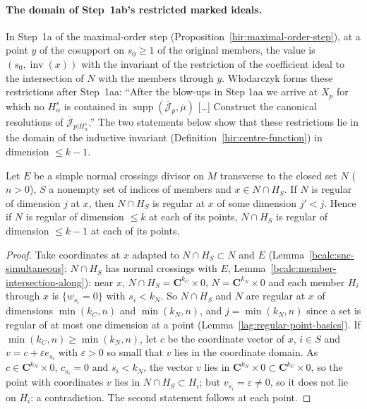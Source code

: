 \paragraph{The domain of Step~1ab's restricted marked ideals.} In Step~1a of the maximal-order step (Proposition~\ref{hir:maximal-order-step}), at a point
\(y\) of the cosupport on \(s_0\ge1\) of the original members, the value is \((s_0,\operatorname{inv}(x))\) with the invariant of the restriction of the coefficient ideal
to the intersection of \(N\) with the members through \(y\). Włodarczyk forms these restrictions after Step~1aa: ``After the blow-ups in Step 1aa we arrive at
\(X_p\) for which no \(H^s_\alpha\) is contained in \(\operatorname{supp}(\overline{\mathcal J}_p,\overline\mu)\) [\dots] Construct the canonical resolutions of
\(\overline{\mathcal J}_{p|H^s_\alpha}\).'' The two statements below show that these restrictions lie in the domain of the inductive invariant
(Definition~\ref{hir:centre-function}) in dimension \(\le k-1\).

\begin{lemma}
\label{bcalc:member-intersection-dim}
\leanok
Let \(E\) be a simple normal crossings divisor on \(M\) transverse to the closed set \(N\) (\(n>0\)), \(S\) a nonempty set of indices of members and
\(x\in N\cap H_S\). If \(N\) is regular of dimension \(j\) at \(x\), then \(N\cap H_S\) is regular at \(x\) of some dimension \(j'<j\). Hence if \(N\) is regular of
dimension \(\le k\) at each of its points, \(N\cap H_S\) is regular of dimension \(\le k-1\) at each of its points.
\end{lemma}
\begin{proof}
\leanok
Take coordinates at \(x\) adapted to \(N\cap H_S\subset N\) and \(E\) (Lemma~\ref{bcalc:snc-simultaneous}; \(N\cap H_S\) has normal crossings with \(E\),
Lemma~\ref{bcalc:member-intersection-along}): near \(x\), \(N\cap H_S=\mathbf C^{k_C}\times0\), \(N=\mathbf C^{k_N}\times0\) and each member \(H_i\) through \(x\) is
\(\{w_{s_i}=0\}\) with \(s_i<k_N\). So \(N\cap H_S\) and \(N\) are regular at \(x\) of dimensions \(\min(k_C,n)\) and \(\min(k_N,n)\), and \(j=\min(k_N,n)\) since a set is regular of at
most one dimension at a point (Lemma~\ref{lag:regular-point-basics}). If \(\min(k_C,n)\ge\min(k_N,n)\), let \(c\) be the coordinate vector of \(x\), \(i\in S\) and
\(v=c+\varepsilon e_{s_i}\) with \(\varepsilon>0\) so small that \(v\) lies in the coordinate domain. As \(c\in\mathbf C^{k_N}\times0\), \(c_{s_i}=0\) and \(s_i<k_N\), the vector
\(v\) lies in \(\mathbf C^{k_N}\times0\subset\mathbf C^{k_C}\times0\), so the point with coordinates \(v\) lies in \(N\cap H_S\subset H_i\); but \(v_{s_i}=\varepsilon\ne0\), so it does not
lie on \(H_i\): a contradiction. The second statement follows at each point.
\end{proof}

